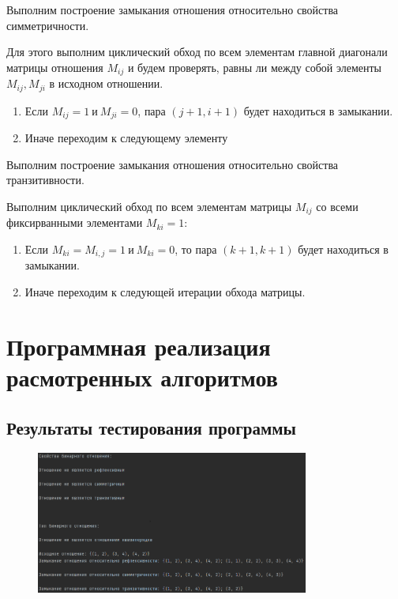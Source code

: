\documentclass[bachelor, och, labwork]{shiza}
\begin{document}
Выполним построение замыкания отношения относительно свойства 
симметричности.

Для этого выполним циклический обход по всем элементам главной диагонали 
матрицы отношения $M_{ij}$ и будем проверять, равны ли между собой элементы 
$M_{ij},M_{ji}$ в исходном отношении.

\begin{enumerate}

    \item Если $M_{ij} = 1 ~\text{и}~ M_{ji} = 0$, пара $(j + 1, i + 1)$ будет 
    находиться в замыкании.

    \item Иначе переходим к следующему элементу

\end{enumerate}

Выполним построение замыкания отношения относительно свойства транзитивности.

Выполним циклический обход по всем элементам матрицы $M_{ij}$ со всеми
фиксирванными элементами $M_{ki}=1$:

\begin{enumerate}
    
    \item Если $M_{ki}=M_{i,j}=1 ~\text{и}~ M_{ki}=0$, то пара 
    $(k + 1, k + 1)$ будет находиться в замыкании.

    \item Иначе переходим к следующей итерации обхода матрицы.

\end{enumerate}


\section{Программная реализация расмотренных алгоритмов}
    
    \subsection{Результаты тестирования программы}

        \begin{figure}[H]
            \centering
            \includegraphics[width=0.8\textwidth]{pic/1.png}
            \caption{}
        \end{figure}
    
\end{document}
